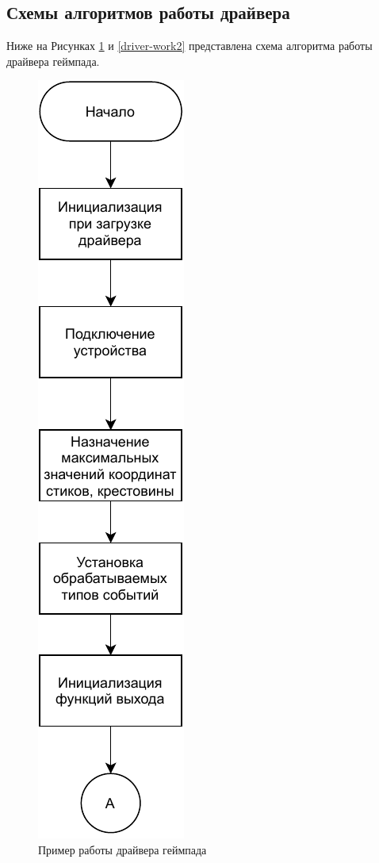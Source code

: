 \subsection{Схемы алгоритмов работы драйвера}
Ниже на Рисунках \ref{driver-work1} и \ref{driver-work2} представлена схема алгоритма работы драйвера геймпада.

\begin{figure}[h!]
	\centering
	\includegraphics[scale=1.4]{img/driver-work1.pdf}
	\caption{Пример работы драйвера геймпада}
	\label{driver-work1}
\end{figure}
\newpage

